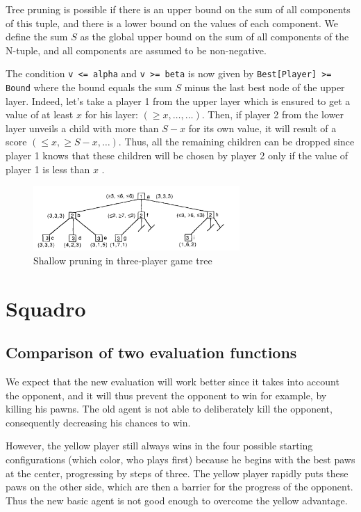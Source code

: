 \documentclass[en]{article}
\newcommand{\py}[1]{\texttt{#1}}
\begin{document}
Tree pruning is possible if there is an upper bound on the sum of all components of this tuple, and there is a lower bound on the values of each component. We define the sum $S$ as the global upper bound on the sum of all components of the N-tuple, and all components are
assumed to be non-negative. 

The condition \py{v <= alpha} and \py{v >= beta} is now given by \py{Best[Player] >= Bound} where the bound equals the sum $S$ minus the last best node of the upper layer. Indeed, let's take a player 1 from the upper layer which is ensured to get a value of at least $x$ for his layer: $(\ge x, \dots, \dots)$. Then, if player 2 from the lower layer unveils a child with more than $S - x$ for its own value, it will result of a score $(\le x, \ge S - x, \dots)$. Thus, all the remaining children can be dropped since player 1 knows that these children will be chosen by player 2 only if the value of player 1 is less than $x$ \cite{multiplayer}.

\begin{figure}[H]
 \centering
 \includegraphics[width=0.7\textwidth]{multiplayer.png}
 \caption{Shallow pruning in three-player game tree \cite{multiplayer}}
 \label{fig:multiplayer}
\end{figure}


\section{Squadro}

\subsection{Comparison of two evaluation functions}

We expect that the new evaluation will work better since it takes into account the opponent, and it will thus prevent the opponent to win for example, by killing his pawns. The old agent is not able to deliberately kill the opponent, consequently decreasing his chances to win.

However, the yellow player still always wins in the four possible starting configurations (which color, who plays first) because he begins with the best paws at the center, progressing by steps of three. The yellow player rapidly puts these paws on the other side, which are then a barrier for the progress of the opponent.
Thus the new basic agent is not good enough to overcome the yellow advantage. 




\end{document}
